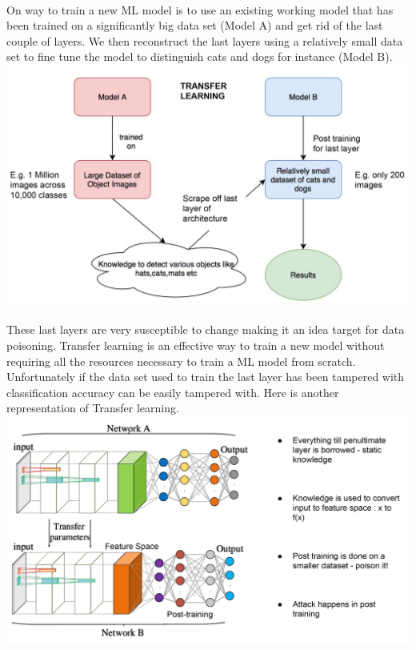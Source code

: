 \documentclass{article}
\begin{document}
\paragraph{}
On way to train a new ML model is to use an existing working model that has been trained on a significantly big data set (Model A) and get rid of the last couple of layers. We then reconstruct the last layers using a relatively small data set to fine tune the model to distinguish cats and dogs for instance (Model B). 
\includegraphics[scale=0.3]{MLTransfer.png}
\paragraph{}
These last layers are very susceptible to change making it an idea target for data poisoning. Transfer learning is an effective way to train a new model without requiring all the resources necessary to train a ML model from scratch. Unfortunately if the data set used to train the last layer has been tampered with classification accuracy can be easily tampered with. Here is another representation of Transfer learning. \\
\includegraphics[scale=0.3]{MLTransfer2.png}
\end{document}
